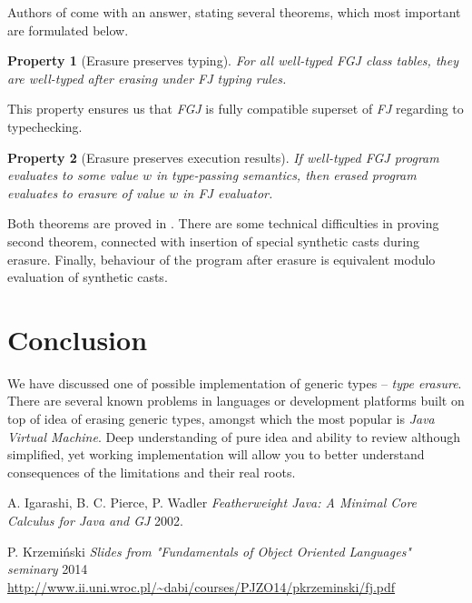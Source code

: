 \documentclass{article}[12pt]
\begin{document}
Authors of \cite{fj} come with an answer, stating several theorems, which most important are formulated below.
\newtheorem{theorem}{Property}
\begin{theorem}[Erasure preserves typing]
For all well-typed \emph{FGJ} class tables, they are well-typed after erasing under \emph{FJ} typing rules.
\end{theorem}
This property ensures us that \emph{FGJ} is fully compatible superset of \emph{FJ} regarding to typechecking.

\begin{theorem}[Erasure preserves execution results]
If well-typed \emph{FGJ} program evaluates to some value $w$ in type-passing semantics, then erased program evaluates to erasure of value $w$ in \emph{FJ} evaluator.
\end{theorem}

Both theorems are proved in \cite{fj}. There are some technical difficulties in proving second theorem, connected with insertion of special synthetic casts during erasure. Finally, behaviour of the program after erasure is equivalent modulo evaluation of synthetic casts.

\section{Conclusion}

We have discussed one of possible implementation of generic types -- \emph{type erasure}. There are several known problems in languages or development platforms built on top of idea of erasing generic types, amongst which the most popular is \emph{Java Virtual Machine}. Deep understanding of pure idea and ability to review although simplified, yet working implementation will allow you to better understand consequences of the limitations and their real roots. 

\begin{thebibliography}{1}

   A. Igarashi, B. C. Pierce, P. Wadler {\em Featherweight Java: A Minimal Core Calculus for Java and GJ}  2002.

   P. Krzemiński {\em Slides from "Fundamentals of Object Oriented Languages" seminary} 2014 \\
    \url{http://www.ii.uni.wroc.pl/~dabi/courses/PJZO14/pkrzeminski/fj.pdf}


\end{thebibliography}
\end{document}
